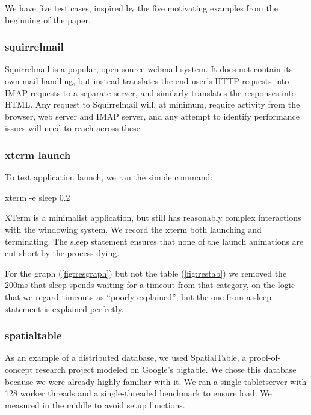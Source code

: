 \documentclass[10pt]{article}
\begin{document}
We have five test cases, inspired by the five motivating examples from the beginning of the paper.

\subsubsection{squirrelmail}

Squirrelmail\cite{squirrelmail} is a popular, open-source webmail system.  It does not contain its own mail handling, but instead translates the end user's HTTP requests into IMAP requests to a separate server, and similarly translates the responses into HTML.  Any request to Squirrelmail will, at minimum, require activity from the browser, web server and IMAP server, and any attempt to identify performance issues will need to reach across these.

\subsubsection{xterm launch}

To test application launch, we ran the simple command:

\begin{tt} xterm -e sleep 0.2 \end{tt}

XTerm is a minimalist application, but still has reasonably complex interactions with the windowing system.  We record the xterm both launching and terminating.  The sleep statement ensures that none of the launch animations are cut short by the process dying.

For the graph (\ref{fig:resgraph}) but not the table (\ref{fig:restab}) we removed the 200ms that sleep spends waiting for a timeout from that category, on the logic that we regard timeouts as ``poorly explained'', but the one from a sleep statement is explained perfectly.

\subsubsection{spatialtable}

As an example of a distributed database, we used SpatialTable\cite{spatialtable}, a proof-of-concept research project modeled on Google's bigtable\cite{bigtable}.  We chose this database because we were already highly familiar with it.  We ran a single tabletserver with 128 worker threads and a single-threaded benchmark to ensure load.  We measured in the middle to avoid setup functions.
\end{document}
